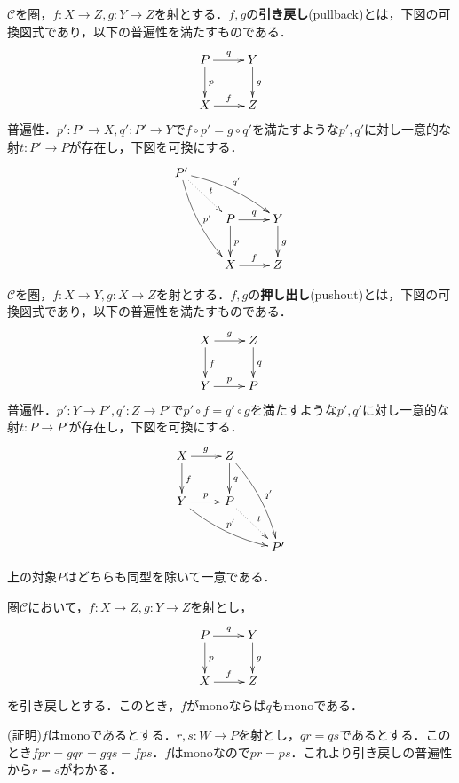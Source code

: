 \begin{defi}
$\mathcal{C}$を圏，$f:X \to Z, g:Y \to Z$を射とする．$f,g$の{\bf 引き戻し}(pullback)とは，下図の可換図式であり，以下の普遍性を満たすものである．
\[
\xymatrix
{
P \ar[r]^{q} \ar[d]^{p} 	& Y \ar[d]^g\\
X \ar[r]^{f}			& Z
}
\]
普遍性．$p' : P' \to X, q': P' \to Y$で$f \circ p' = g\circ q'$を満たすような$p',q'$に対し一意的な射$t:P' \to P$が存在し，下図を可換にする．
\[
\xymatrix
{
P' \ar@/_/[rdd]^{p'} \ar@/^/[rrd]^{q'}  \ar@{.>}[rd]^t\\
&	P \ar[d]^{p} \ar[r]^{q} 	& Y \ar[d]^g\\
&	X \ar[r]^{f}			& Z
}
\]
\end{defi} \proofend

\begin{defi}
$\mathcal{C}$を圏，$f:X \to Y, g:X \to Z$を射とする．$f,g$の{\bf 押し出し}(pushout)とは，下図の可換図式であり，以下の普遍性を満たすものである．
\[
\xymatrix
{
X \ar[r]^{g} \ar[d]^{f} 	& Z \ar[d]^q\\
Y \ar[r]^{p}			& P
}
\]
普遍性．$p' : Y \to P', q': Z \to P'$で$p' \circ f  =q' \circ g$を満たすような$p',q'$に対し一意的な射$t:P \to P'$が存在し，下図を可換にする．
\[
\xymatrix
{
X \ar[r]^{g} \ar[d]^{f} 	& Z \ar[d]^q\ar@/^/[rdd]^{q'}\\ 
Y \ar[r]^{p} \ar@/_/[rrd]^{p'}& P \ar@{.>}[rd]^t  \\
&&P'
}
\]
\end{defi} \proofend

上の対象$P$はどちらも同型を除いて一意である．

\begin{prop}
圏$\mathcal{C}$において，$f:X \to Z, g:Y \to Z$を射とし，
\[
\xymatrix
{
P \ar[d]^{p} \ar[r]^{q} 	& Y \ar[d]^g\\
X \ar[r]^{f}			& Z
}
\]
を引き戻しとする．このとき，$f$がmonoならば$q$もmonoである．
\end{prop}
(証明)$f$はmonoであるとする．$r,s:W \to P$を射とし，$qr=qs$であるとする．このとき$fpr = gqr = gqs = fps$．$f$はmonoなので$pr=ps$．これより引き戻しの普遍性から$r=s$がわかる．

